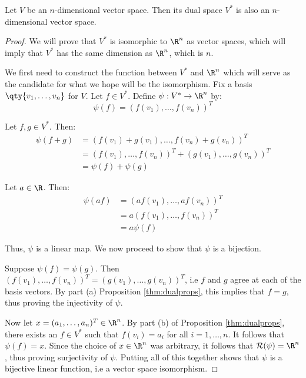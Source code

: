 \begin{theorem}
  \label{thm:ndual}
  Let \( V \) be an \( n \)-dimensional vector space. Then its dual space \( V^* \) is also an \( n \)-dimensional vector space.
\end{theorem}
\begin{proof}
  We will prove that \( V^* \) is isomorphic to \( \R^n \) as vector spaces, which will imply that \( V^* \) has the same dimension as \( \R^n \), which is \( n \).

  \vspace{3mm}

  We first need to construct the function between \( V^* \) and \( \R^n \) which will serve as the candidate for what we hope will be the isomorphism. Fix a basis \( \qty{v_1,\dots,v_n} \) for \( V \). Let \( f\in V^* \). Define \( \psi:V^*\to\R^n \) by:
  \[ \psi(f)=(f(v_1),\dots,f(v_n))^T \]

  Let \( f,g\in V^* \). Then:
  \begin{align*}
    \psi(f+g)&= (f(v_1)+g(v_1),\dots,f(v_n)+g(v_n))^T\\
    &= (f(v_1),\dots,f(v_n))^T+(g(v_1),\dots,g(v_n))^T\\
    &= \psi(f)+\psi(g)
  \end{align*}

  Let \( a\in\R \). Then:
  \begin{align*}
    \psi(af)&=(af(v_1),\dots,af(v_n))^T\\
    &= a(f(v_1),\dots,f(v_n))^T\\
    &= a\psi(f)
  \end{align*}

  Thus, \( \psi \) is a linear map. We now proceed to show that \( \psi \) is a bijection.

  \vspace{3mm}

  Suppose \( \psi(f)=\psi(g) \). Then \( (f(v_1),\dots,f(v_n))^T=(g(v_1),\dots,g(v_n))^T \), i.e \( f \) and \( g \) agree at each of the basis vectors. By part (a) Proposition \ref{thm:dualprops}, this implies that \( f=g \), thus proving the injectivity of \( \psi \).

  \vspace{3mm}

  Now let \( x=(a_1,\dots,a_n)^T\in\R^n \). By part (b) of Proposition \ref{thm:dualprops}, there exists an \( f\in V^* \) such that \( f(v_i)=a_i \) for all \( i=1,\dots, n \). It follows that \( \psi(f)=x \). Since the choice of \( x\in\R^n \) was arbitrary, it follows that \( \mathcal{R}(\psi)=\R^n \), thus proving surjectivity of \( \psi \). Putting all of this together shows that \( \psi \) is a bijective linear function, i.e a vector space isomorphism.
\end{proof}

